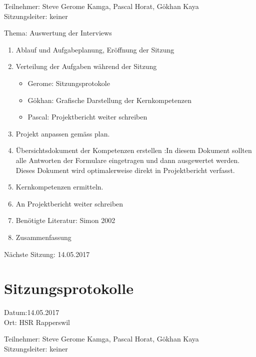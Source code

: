 Teilnehmer: Steve Gerome Kamga, Pascal Horat, Gökhan Kaya\\
Sitzungsleiter: keiner

Thema: Auswertung der Interviews

\begin{enumerate}

\item Ablauf und Aufgabeplanung, Eröffnung der Sitzung 

\item  Verteilung der Aufgaben während der Sitzung
\begin{itemize}
\item Gerome: Sitzungsprotokole
\item Gökhan: Grafische Darstellung der Kernkompetenzen
\item Pascal: Projektbericht weiter schreiben
\end{itemize}

\item	Projekt anpassen gemäss plan.


\item 	Übersichtsdokument der Kompetenzen erstellen :In diesem Dokument sollten alle Antworten der Formulare eingetragen und dann ausgewertet werden. Dieses Dokument wird optimalerweise direkt in Projektbericht verfasst.

\item 	Kernkompetenzen ermitteln.

\item 	An Projektbericht weiter schreiben

\item Benötigte Literatur: Simon 2002   \cite{simon2002entwicklung}

\item Zusammenfassung

\end{enumerate}

Nächste Sitzung: 14.05.2017

\newpage
\section*{Sitzungsprotokolle}

Datum:14.05.2017\\
Ort: HSR Rapperswil

Teilnehmer: Steve Gerome Kamga, Pascal Horat, Gökhan Kaya\\
Sitzungsleiter: keiner

